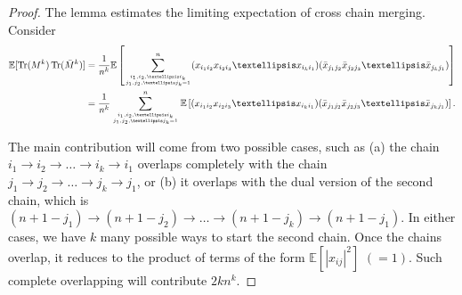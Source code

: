 \documentclass[12pt]{amsart}
\theoremstyle{plain}
\theoremstyle{definition}
\newcommand{\Tr}{\operatorname{Tr}}
\begin{document}
\begin{proof}The lemma estimates the limiting expectation of  cross chain merging. Consider
\begin{align*}
\mathbb{E}[\Tr(M^{k})\Tr(\bar{M}^{k})] &= \frac{1}{n^{k}}\mathbb{E}\left[\sum_{{i_{1},i_{2},\dots i_{k} \atop j_{1}, j_{2}, \dots j_{k} = 1}}^{n}(x_{i_{1}i_{2}}x_{i_{2}i_{3}}\dots x_{i_{k}i_{1}})(\bar{x}_{j_{1}j_{2}}\bar{x}_{j_{2}j_{3}}\dots \bar{x}_{j_{k}j_{1}})\right]\\
&= \frac{1}{n^{k}} \sum_{{i_{1},i_{2},\dots i_{k} \atop j_{1}, j_{2}, \dots j_{k}= 1}}^{n}\mathbb{E}\left[(x_{i_{1}i_{2}}x_{i_{2}i_{3}}\dots x_{i_{k}i_{1}})(\bar{x}_{j_{1}j_{2}}\bar{x}_{j_{2}j_{3}}\dots \bar{x}_{j_{k}j_{1}})\right].
\end{align*}

The main contribution will come from two possible cases, such as (a) the chain  $i_{1}\rightarrow i_{2}\rightarrow \dots \rightarrow i_{k}\to i_{1}$ overlaps completely with the chain $j_{1}\rightarrow j_{2}\rightarrow \dots \rightarrow j_{k}\to j_{1}$, or (b) it overlaps with the dual version of the second chain, which is $(n+1-j_{1})\rightarrow (n+1-j_{2})\rightarrow \dots \rightarrow (n+1-j_{k})\rightarrow (n+1-j_{1}).$ In either cases, we have $k$ many possible ways to start the second chain. Once the chains overlap, it reduces to the product of terms of the form $\mathbb{E}[|x_{ij}|^{2}]$ $(=1)$. Such complete overlapping will contribute $2kn^{k}.$ 


\end{proof}
\end{document}
